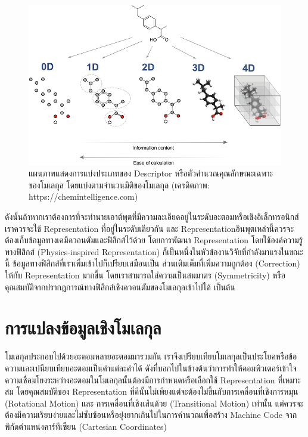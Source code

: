 \begin{figure}[H]
    \centering
    \includegraphics[width=\linewidth]{fig/descriptor_classes.png}
    \caption{แผนภาพแสดงการแบ่งประเภทของ Descriptor หรือตัวคำนวณคุณลักษณะเฉพาะของโมเลกุล โดยแบ่งตามจำนวนมิติของโมเลกุล 
    (เครดิตภาพ: https://chemintelligence.com)}
    \label{fig:descriptor_classes}
\end{figure}

ดังนั้นถ้าหากเราต้องการที่จะทำนายเอาต์พุตที่มีความละเอียดอยู่ในระดับอะตอมหรือเชิงอิเล็กทรอนิกส์ เราควรจะใช้ Representation ที่อยู่ในระดับเดียวกัน 
และ Representationอินพุตเหล่านี้ควรจะต้องเก็บข้อมูลทางเคมีควอนตัมและฟิสิกส์ไว้ด้วย โดยการพัฒนา Representation โดยใช้องค์ความรู้ทางฟิสิกส์
(Physics-inspired Representation) ก็เป็นหนึ่งในหัวข้องานวิจัยที่กำลังมาแรงในขณะนี้ ข้อมูลทางฟิสิกส์ที่เราเพิ่มเข้าไปก็เปรียบเสมือนเป็น%
ส่วนเติมเต็มที่เพิ่มความถูกต้อง (Correction) ให้กับ Representation มากขึ้น โดยเราสามารถใส่ความเป็นสมมาตร (Symmetricity) 
หรือคุณสมบัติจากปรากฎการณ์ทางฟิสิกส์เชิงควอนตัมของโมเลกุลเข้าไปได้ เป็นต้น 

\section{การแปลงข้อมูลเชิงโมเลกุล}
\label{sec:mol_transform}

โมเลกุลประกอบไปด้วยอะตอมหลายอะตอมมารวมกัน เราจึงเปรียบเทียบโมเลกุลเป็นประโยคหรือข้อความและเปนียบเทียบอะตอมเป็นคำแต่ละคำได้
ดังที่บอกไปในข้างต้นว่าการทำให้คอมพิวเตอร์เข้าใจความเชื่อมโยงระหว่างอะตอมในโมเลกุลนั้นต้องมีการกำหนดหรือเลือกใช้ Representation ที่เหมาะสม
โดยคุณสมบัติของ Representation ที่ดีนั้นไม่เพียงแต่จะต้องไม่ขึ้นกับการเคลื่อนที่เชิงการหมุน (Rotational Motion) และ การเคลื่อนที่เชิงเส้นด้วย 
(Transitional Motion) เท่านั้น แต่ควรจะต้องมีความเรียบง่ายและไม่ซับซ้อนหรือยุ่งยากเกินไปในการคำนวณเพื่อสร้าง Machine Code 
จากพิกัดตำแหน่งคาร์ทีเซียน (Cartesian Coordinates)

